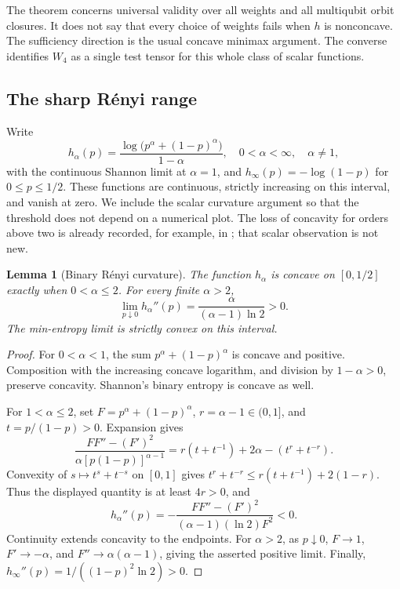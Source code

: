 \documentclass[11pt,a4paper]{article}
\newtheorem{lemma}[theorem]{Lemma}
\begin{document}
The theorem concerns universal validity over all weights and all
multiqubit orbit closures. It does not say that every choice of
weights fails when \(h\) is nonconcave. The sufficiency direction
is the usual concave minimax argument. The converse identifies
\(W_4\) as a single test tensor for this whole class of scalar functions.

\subsection{The sharp R\'enyi range}
Write
\[
 h_\alpha(p)=\frac{\log\bigl(p^\alpha+(1-p)^\alpha\bigr)}{1-\alpha},
 \quad 0<\alpha<\infty,\quad\alpha\ne1,
\]
with the continuous Shannon limit at \(\alpha=1\), and
\(h_\infty(p)=-\log(1-p)\) for \(0\le p\le1/2\).
These functions are continuous, strictly increasing on this interval,
and vanish at zero. We include the scalar curvature argument so that
the threshold does not depend on a numerical plot. The loss of
concavity for orders above two is already recorded, for example,
in \cite[Lemma 4.3]{Hillion}; that scalar observation is not new.

\begin{lemma}[Binary R\'enyi curvature]\label{lem:renyi}
The function \(h_\alpha\) is concave on \([0,1/2]\) exactly when
\(0<\alpha\le2\). For every finite \(\alpha>2\),
\[
 \lim_{p\downarrow0}h_\alpha''(p)
 =\frac{\alpha}{(\alpha-1)\ln2}>0.
\]
The min-entropy limit is strictly convex on this interval.
\end{lemma}
\begin{proof}
For \(0<\alpha<1\), the sum \(p^\alpha+(1-p)^\alpha\) is concave
and positive. Composition with the increasing concave logarithm,
and division by \(1-\alpha>0\), preserve concavity. Shannon's
binary entropy is concave as well.

For \(1<\alpha\le2\), set \(F=p^\alpha+(1-p)^\alpha\),
\(r=\alpha-1\in(0,1]\), and \(t=p/(1-p)>0\). Expansion gives
\[
 \frac{FF''-(F')^2}{\alpha[p(1-p)]^{\alpha-1}}
 =r(t+t^{-1})+2\alpha-(t^r+t^{-r}).
\]
Convexity of \(s\mapsto t^s+t^{-s}\) on \([0,1]\) gives
\(t^r+t^{-r}\le r(t+t^{-1})+2(1-r)\).
Thus the displayed quantity is at least \(4r>0\), and
\[
 h_\alpha''(p)
 =-\frac{FF''-(F')^2}{(\alpha-1)(\ln2)F^2}<0.
\]
Continuity extends concavity to the endpoints. For \(\alpha>2\),
as \(p\downarrow0\), \(F\to1\), \(F'\to-\alpha\), and
\(F''\to\alpha(\alpha-1)\), giving the asserted positive limit.
Finally, \(h_\infty''(p)=1/((1-p)^2\ln2)>0\).
\end{proof}
\end{document}
